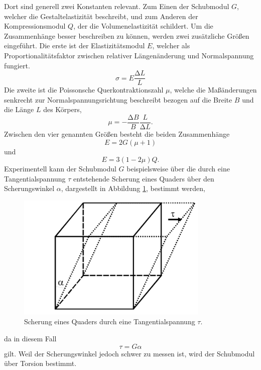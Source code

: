 Dort sind generell zwei Konstanten relevant.
Zum Einen der Schubmodul $G$, welcher die Gestaltelastizität beschreibt, und zum Anderen der Kompressionsmodul $Q$, der die Volumenelastizität schildert.
Um die Zusammenhänge besser beschreiben zu können, werden zwei zusätzliche Größen eingeführt.
Die erste ist der Elastizitätsmodul $E$, welcher als Proportionalitätsfaktor zwischen relativer Längenänderung und Normalspannung fungiert.
\begin{equation}
  \sigma = E \frac{\increment L}{L}
\end{equation}
Die zweite ist die Poissonsche Querkontraktionszahl $\mu$, welche die Maßänderungen senkrecht zur Normalspannungsrichtung beschreibt bezogen auf die Breite $B$ und die Länge $L$ des Körpers,
\begin{equation}
  \mu = - \frac{\increment B}{B} \frac{L}{\increment L}.
\end{equation}
Zwischen den vier genannten Größen besteht die beiden Zusammenhänge
\begin{equation}
  E = 2G(\mu+1) \label{eqn:1}
\end{equation}
und
\begin{equation}
  E = 3(1-2\mu)Q. \label{eqn:2}    %
\end{equation}
Experimentell kann der Schubmodul $G$ beispielsweise über die durch eine Tangentialspannung $\tau$ entstehende Scherung eines Quaders über den Scherungswinkel $\alpha$, dargestellt in Abbildung \ref{fig:1}, bestimmt werden,
\begin{figure}[H]
  \centering
  \includegraphics[height=6cm]{scherung1.png}
  \caption{Scherung eines Quaders durch eine Tangentialspannung $\tau$. \cite{sample}}
  \label{fig:1}
\end{figure}
da in diesem Fall
\begin{equation}
  \tau = G \alpha \label{eqn:3}
\end{equation}
gilt.
Weil der Scherungswinkel jedoch schwer zu messen ist, wird der Schubmodul über Torsion bestimmt.
